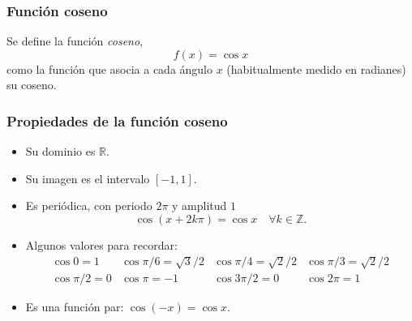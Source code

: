 \begin{frame}
\frametitle{Función coseno}
\begin{definicion}
Se define la función \emph{coseno},
\[f(x)=\cos x\]
como la función que asocia a cada ángulo $x$ (habitualmente medido en radianes) su coseno.
\end{definicion}
\begin{center}
\scalebox{1}{}
\end{center}
\end{frame} 

\begin{frame}
\frametitle{Propiedades de la función coseno}
\begin{itemize}
\item Su dominio es $\mathbb{R}$.
\item Su imagen es el intervalo $[-1,1]$.
\item Es periódica, con periodo $2\pi$ y amplitud $1$
\[\cos (x+2k\pi)= \cos x\quad \forall k\in \mathbb{Z}.\]
\item Algunos valores para recordar:
\[
\begin{array}{llll}
\cos 0=1 & \cos \pi/6= \sqrt{3}/2 & \cos \pi/4=\sqrt{2}/2 & \cos \pi/3= \sqrt{2}/2\\
\cos \pi/2 =0 & \cos \pi = -1 & \cos 3\pi/2=0 & \cos 2\pi=1
\end{array}
\]
\item Es una función par: $\cos(-x)=\cos x$.
\end{itemize}
\end{frame} 


